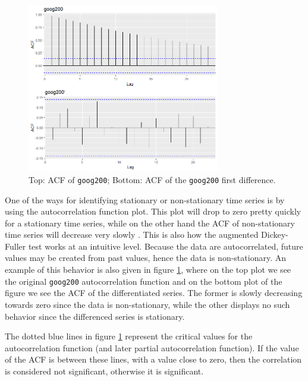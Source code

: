 \documentclass[12pt,a4paper,titlepage]{report}
\begin{document}
\begin{figure}[h]
    \centering
    \includegraphics[width=0.75\textwidth]{dgoog200acf}
    \caption{Top: ACF of \texttt{goog200}; Bottom: ACF of the \texttt{goog200} first difference.}
    \label{goog200acf}
\end{figure}

One of the ways for identifying stationary or non-stationary time series is by using the autocorrelation function plot. This plot will drop to zero pretty quickly for a stationary time series, while on the other hand the ACF of non-stationary time series will decrease very slowly \cite{fpp2stationarity}. This is also how the augmented Dickey-Fuller test works at an intuitive level. Because the data are autocorrelated, future values may be created from past values, hence the data is non-stationary. An example of this behavior is also given in figure \ref{goog200acf}, where on the top plot we see the original \texttt{goog200} autocorrelation function and on the bottom plot of the figure we see the ACF of the differentiated series. The former is slowly decreasing towards zero since the data is non-stationary, while the other displays no such behavior since the differenced series is stationary.


The dotted blue lines in figure \ref{goog200acf} represent the critical values for the autocorrelation function (and later partial autocorrelation function). If the value of the ACF is between these lines, with a value close to zero, then the correlation is considered not significant, otherwise it is significant.
\end{document}
